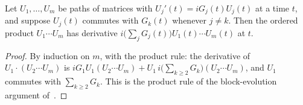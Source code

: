 \begin{theorem}
    \label{thm:ordered_product_evolution}
    \leanok
    Let $U_1,\dots,U_m$ be paths of matrices with $U_j'(t)=iG_j(t)U_j(t)$ at a
    time $t$, and suppose $U_j(t)$ commutes with $G_k(t)$ whenever $j\neq k$.
    Then the ordered product $U_1\cdots U_m$ has derivative
    $i\bigl(\sum_jG_j(t)\bigr)U_1(t)\cdots U_m(t)$ at $t$.
\end{theorem}
\begin{proof}\leanok
    By induction on $m$, with the product rule: the derivative of
    $U_1\cdot(U_2\cdots U_m)$ is
    $iG_1U_1(U_2\cdots U_m)+U_1\,i\bigl(\sum_{k\ge2}G_k\bigr)(U_2\cdots U_m)$,
    and $U_1$ commutes with $\sum_{k\ge2}G_k$. This is the product rule of the
    block-evolution argument of~\cite{Osborne2006Efficient}.
\end{proof}

